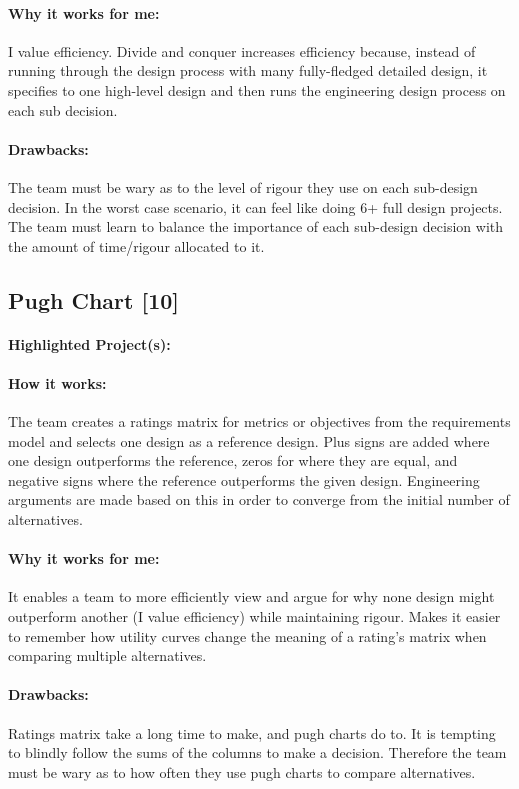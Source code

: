 \documentclass[a4paper,12pt]{article}
\begin{document}
\paragraph{Why it works for me: }
I value efficiency. Divide and conquer increases efficiency because, instead of running through the design process with many fully-fledged detailed design, it specifies to one high-level design and then runs the engineering design process on each sub decision.

\paragraph{Drawbacks: }
The team must be wary as to the level of rigour they use on each sub-design decision. In the worst case scenario, it can feel like doing 6+ full design projects. The team must learn to balance the importance of each sub-design decision with the amount of time/rigour allocated to it.

\subsection{Pugh Chart [10]}
\paragraph{Highlighted Project(s): }
\paragraph{How it works: }
The team creates a ratings matrix for metrics or objectives from the requirements model and selects one design as a reference design. Plus signs are added where one design outperforms the reference, zeros for where they are equal, and negative signs where the reference outperforms the given design. Engineering arguments are made based on this in order to converge from the initial number of alternatives.

\paragraph{Why it works for me: }
It enables a team to more efficiently view and argue for why none design might outperform another (I value efficiency) while maintaining rigour. Makes it easier to remember how utility curves change the meaning of a rating’s matrix when comparing multiple alternatives.

\paragraph{Drawbacks: }
Ratings matrix take a long time to make, and pugh charts do to. It is tempting to blindly follow the sums of the columns to make a decision. Therefore the team must be wary as to how often they use pugh charts to compare alternatives.
\end{document}
